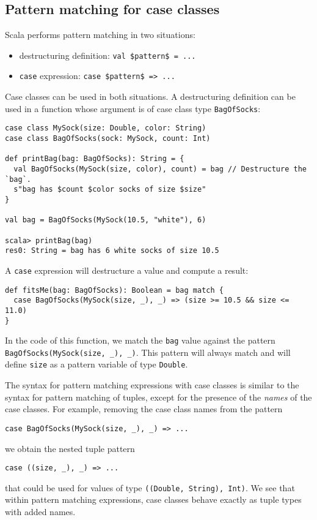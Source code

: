 \subsection{Pattern matching for case classes}

Scala performs pattern matching in two situations:
\begin{itemize}
\item destructuring definition: \lstinline[mathescape=true]!val $pattern$ = ...!
\item \lstinline!case! expression: \lstinline[mathescape=true]!case $pattern$ => ...!
\end{itemize}
Case classes can be used in both situations. A destructuring definition
can be used in a function whose argument is of case class type \lstinline!BagOfSocks!:
\begin{lstlisting}
case class MySock(size: Double, color: String)
case class BagOfSocks(sock: MySock, count: Int)

def printBag(bag: BagOfSocks): String = {
  val BagOfSocks(MySock(size, color), count) = bag // Destructure the `bag`.
  s"bag has $count $color socks of size $size"
}

val bag = BagOfSocks(MySock(10.5, "white"), 6)

scala> printBag(bag)
res0: String = bag has 6 white socks of size 10.5
\end{lstlisting}

A \lstinline!case! expression will destructure a value and compute
a result:
\begin{lstlisting}
def fitsMe(bag: BagOfSocks): Boolean = bag match {
  case BagOfSocks(MySock(size, _), _) => (size >= 10.5 && size <= 11.0)
}
\end{lstlisting}
In the code of this function, we match the \lstinline!bag! value
against the pattern \lstinline!BagOfSocks(MySock(size, _), _)!. This
pattern will always match and will define \lstinline!size! as a pattern
variable of type \lstinline!Double!.

The syntax for pattern matching expressions with case classes is similar
to the syntax for pattern matching of tuples, except for the presence
of the \emph{names} of the case classes. For example, removing the
case class names from the pattern
\begin{lstlisting}
case BagOfSocks(MySock(size, _), _) => ...
\end{lstlisting}
we obtain the nested tuple pattern 
\begin{lstlisting}
case ((size, _), _) => ...
\end{lstlisting}
that could be used for values of type \lstinline!((Double, String), Int)!.
We see that within pattern matching expressions, case classes behave
exactly as tuple types with added names. 

